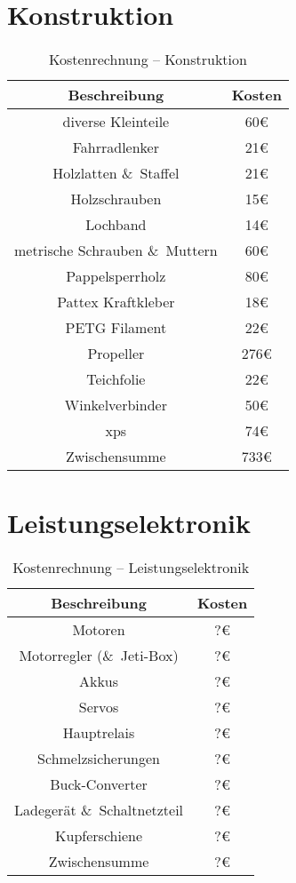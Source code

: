 \section{Konstruktion}
\begin{table}[H]
    \centering
    \begin{tabular}{|c|c|}
        \hline
        \textbf{Beschreibung} & \textbf{Kosten}\\\hline
        diverse Kleinteile & 60\euro\\
        Fahrradlenker & 21\euro\\
        Holzlatten \&\ Staffel & 21\euro\\
        Holzschrauben & 15\euro\\
        Lochband & 14\euro\\
        metrische Schrauben \&\ Muttern & 60\euro\\
        Pappelsperrholz & 80\euro\\
        Pattex Kraftkleber & 18\euro\\
        PETG Filament & 22\euro\\
        Propeller & 276\euro\\
        Teichfolie & 22\euro\\
        Winkelverbinder & 50\euro\\
        \acs{xps} & 74\euro\\        
        \hline
        Zwischensumme & 733\euro\\\hline
    \end{tabular}
    \caption{Kostenrechnung -- Konstruktion}
\end{table}

\section{Leistungselektronik}
\begin{table}[H]
    \centering
    \begin{tabular}{|c|c|}
        \hline
        \textbf{Beschreibung} & \textbf{Kosten}\\\hline
        Motoren & ?\euro\\
        Motorregler (\&\ Jeti-Box)& ?\euro\\
        Akkus & ?\euro\\
        Servos & ?\euro\\
        Hauptrelais & ?\euro\\
        Schmelzsicherungen & ?\euro\\
        Buck-Converter & ?\euro\\
        Ladegerät \&\ Schaltnetzteil & ?\euro\\
        Kupferschiene & ?\euro\\
        \hline
        Zwischensumme & ?\euro\\\hline
    \end{tabular}
    \caption{Kostenrechnung -- Leistungselektronik}
\end{table}

